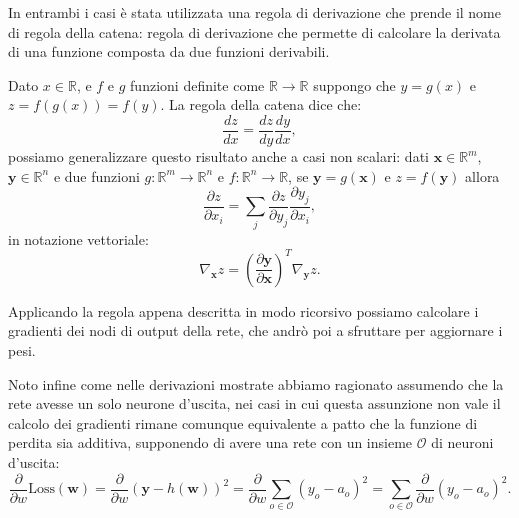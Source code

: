 \documentclass[../../main.tex]{subfiles}
\begin{document}
In entrambi i casi è stata utilizzata una regola di derivazione che prende il nome di regola della catena: regola di derivazione che permette di calcolare la derivata di una funzione composta da due funzioni derivabili.

Dato $x \in \mathbb{R}$, e $f$ e $g$ funzioni definite come $\mathbb{R} \rightarrow \mathbb{R}$ suppongo che $y = g(x)$ e $z = f(g(x)) = f(y)$. La regola della catena dice che:
\[\frac{dz}{dx} = \frac{dz}{dy} \frac{dy}{dx},\]
possiamo generalizzare questo risultato anche a casi non scalari: dati $\boldsymbol{x} \in \mathbb{R}^m$, $\boldsymbol{y} \in \mathbb{R}^n$ e due funzioni $g: \mathbb{R}^m \rightarrow \mathbb{R}^n$ e $f: \mathbb{R}^n \rightarrow \mathbb{R}$, se $\boldsymbol{y} = g(\boldsymbol{x})$ e $z = f(\boldsymbol{y})$ allora
\[\frac{\partial z}{\partial x_i} = \sum_j \frac{\partial z}{\partial y_j} \frac{\partial y_j}{\partial x_i},\]
in notazione vettoriale:
\[\nabla_{\boldsymbol{x}} z = \left(\frac{\partial \boldsymbol{y}}{\partial \boldsymbol{x}}\right)^T \nabla_{\boldsymbol{y}} z.\]

Applicando la regola appena descritta in modo ricorsivo possiamo calcolare i gradienti dei nodi di output della rete, che andrò poi a sfruttare per aggiornare i pesi. 

Noto infine come nelle derivazioni mostrate abbiamo ragionato assumendo che la rete avesse un solo neurone d'uscita, nei casi in cui questa assunzione non vale il calcolo dei gradienti rimane comunque equivalente a patto che la funzione di perdita sia additiva, supponendo di avere una rete con un insieme $\mathcal{O}$ di neuroni d'uscita:
\[\frac{\partial}{\partial w} \mathrm{Loss}(\boldsymbol{w}) = \frac{\partial}{\partial w} (\boldsymbol{y} - h(\boldsymbol{w}))^2 = \frac{\partial}{\partial w} \sum_{o \in \mathcal{O}} (y_o - a_o) ^ 2 = \sum_{o \in \mathcal{O}} \frac{\partial}{\partial w} (y_o - a_o) ^ 2.\]
\end{document}
